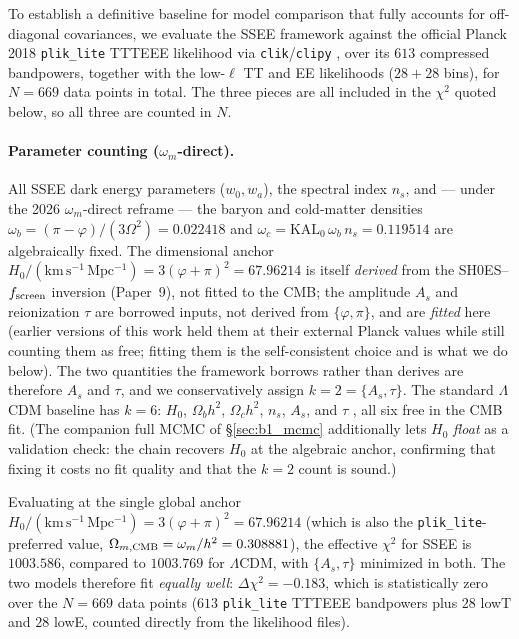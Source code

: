 \documentclass[12pt,a4paper]{article}
\begin{document}
To establish a definitive baseline for model comparison that fully accounts for off-diagonal covariances, we evaluate the SSEE framework against the official Planck 2018 \texttt{plik\_lite} TTTEEE likelihood via \texttt{clik}/\texttt{clipy} \citep{Torrado2021}, over its $613$ compressed bandpowers, together with the low-$\ell$ TT and EE likelihoods ($28+28$ bins), for $N=669$ data points in total. The three pieces are all included in the $\chi^2$ quoted below, so all three are counted in $N$.

\paragraph{Parameter counting ($\omega_m$-direct).}
All SSEE dark energy parameters ($w_0, w_a$), the spectral index $n_s$, and --- under the 2026 $\omega_m$-direct reframe --- the baryon and cold-matter densities $\omega_b=(\pi-\varphi)/(3\Omega^2)=0.022418$ and $\omega_c=\mathrm{KAL}_0\,\omega_b\,n_s=0.119514$ are algebraically fixed. The dimensional anchor $H_0/(\mathrm{km\,s^{-1}\,Mpc^{-1}}) = 3(\varphi+\pi)^2 = 67.96214$ is itself \emph{derived} from the SH0ES--$f_{\rm screen}$ inversion (Paper~9), not fitted to the CMB; the amplitude $A_s$ and reionization $\tau$ are borrowed inputs, not derived from $\{\varphi,\pi\}$, and are \emph{fitted} here (earlier versions of this work held them at their external Planck values while still counting them as free; fitting them is the self-consistent choice and is what we do below). The two quantities the framework borrows rather than derives are therefore $A_s$ and $\tau$, and we conservatively assign $k=2=\{A_s,\tau\}$. The standard $\Lambda$CDM baseline has $k=6$: $H_0$, $\Omega_b h^2$, $\Omega_c h^2$, $n_s$, $A_s$, and $\tau$ \citep{Planck2018}, all six free in the CMB fit. (The companion full MCMC of \S\ref{sec:b1_mcmc} additionally lets $H_0$ \emph{float} as a validation check: the chain recovers $H_0$ at the algebraic anchor, confirming that fixing it costs no fit quality and that the $k=2$ count is sound.)

Evaluating at the single global anchor $H_0/(\mathrm{km\,s^{-1}\,Mpc^{-1}}) = 3(\varphi+\pi)^2 = 67.96214$ (which is also the \texttt{plik\_lite}-preferred value, $\Omega_{m,\rm CMB}=\omega_m/h^2=0.308881$), the effective $\chi^2$ for SSEE is $1003.586$, compared to $1003.769$ for $\Lambda$CDM, with $\{A_s,\tau\}$ minimized in both. The two models therefore fit \emph{equally well}: $\Delta\chi^2 = -0.183$, which is statistically zero over the $N=669$ data points ($613$ \texttt{plik\_lite} TTTEEE bandpowers plus $28$ lowT and $28$ lowE, counted directly from the likelihood files).
\end{document}
